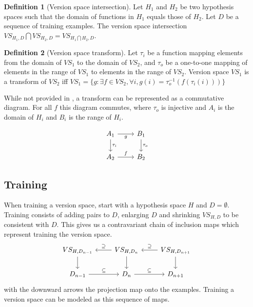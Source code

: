 \documentclass{article}
\theoremstyle{definition}
\newtheorem{definition}{Definition}[section]
\begin{document}
\begin{definition}[Version space intersection]
Let $H_1$ and $H_2$ be two hypothesis spaces such that the domain of functions in $H_1$ equals those of $H_2$. Let $D$ be a sequence of training examples. The version space intersection $VS_{H_1, D} \bigcap VS_{H_2, D} = VS_{H_1\bigcap H_2, D}$.
\end{definition}


\begin{definition}[Version space transform]
Let $\tau_i$ be a function mapping elements from the domain of $VS_1$ to the domain of $VS_2$, and $\tau_o$ be a one-to-one mapping of elements in the range of $VS_1$ to elements in the range of $VS_2$. Version space $VS_1$ is a transform of $VS_2$ iff $VS_1 = \{g : \exists f \in VS_2, \forall i,  g(i) = \tau_o^{-1}(f(\tau_i(i)))\}$

While not provided in \cite{short}, a transform can be represented as a commutative diagram. For all $f$ this diagram commutes, where $\tau_o$ is injective and $A_i$ is the domain of $H_i$ and $B_i$ is the range of $H_i$. 

\[\begin{tikzcd}
	{A_1} & {B_1} \\
	{A_2} & {B_2}
	\arrow["{\tau_i}", from=1-1, to=2-1]
	\arrow["g"', from=1-1, to=1-2]
	\arrow["{\tau_o}", to=2-2, from=1-2]
	\arrow["f", from=2-1, to=2-2]
\end{tikzcd}\]

\subsection{Training}
When training a version space, start with a hypothesis space $H$ and $D= \emptyset$. Training consists of adding pairs to $D$, enlarging $D$ and shrinking $VS_{H,D}$ to be consistent with $D$.  This gives us a contravariant chain of inclusion maps which represent training the version space. 
\[\begin{tikzcd}
	{VS_{H,D_{n-1}}} & {VS_{H,D_n}} & {VS_{H,D_{n+1}}} \\
	{D_{n-1}} & {D_n} & {D_{n+1}}
	\arrow["\supseteq"', from=1-3, to=1-2]
	\arrow["\subseteq", from=2-2, to=2-3]
	\arrow[from=1-2, to=2-2]
	\arrow[from=1-3, to=2-3]
	\arrow["\supseteq"', from=1-2, to=1-1]
	\arrow["\subseteq", from=2-1, to=2-2]
	\arrow[from=1-1, to=2-1]
\end{tikzcd}\]
with the downward arrows the projection map onto the examples. Training a version space can be modeled as this sequence of maps.


\end{definition}
\end{document}
